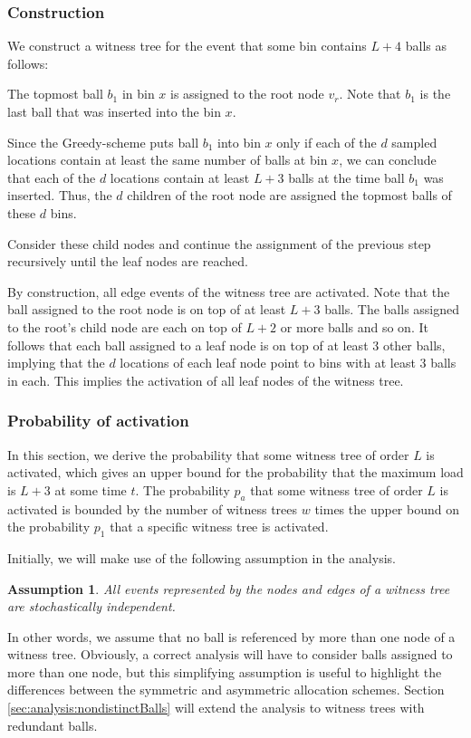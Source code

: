 \documentclass[a4paper,12pt]{article}
\newtheorem{assumption}{Assumption}
\begin{document}
\subsubsection{Construction}
\label{sec:analysis:constructionSymWT}
We construct a witness tree for the event that some bin contains $L+4$ balls as follows:
\begin{compactenum}
\item The topmost ball $b_1$ in bin $x$ is assigned to the root node $v_r$. Note that $b_1$ is the last ball that was inserted into the bin $x$.
\item Since the Greedy-scheme puts ball $b_1$ into bin $x$ only if each of the $d$ sampled locations contain at least the same number of balls at bin $x$, we can conclude that each of the $d$ locations contain at least $L+3$ balls at the time ball $b_1$ was inserted. Thus, the $d$ children of the root node are assigned the topmost balls of these $d$ bins.
\item Consider these child nodes and continue the assignment of the previous step recursively until the leaf nodes are reached.  
\end{compactenum}

By construction, all edge events of the witness tree are activated. Note that the ball assigned to the root node is on top of at least $L+3$ balls. The balls assigned to the root's child node are each on top of $L+2$ or more balls and so on. It follows that each ball assigned to a leaf node is on top of at least 3 other balls, implying that the $d$ locations of each leaf node point to bins with at least 3 balls in each. This implies the activation of all leaf nodes of the witness tree.

\subsubsection{Probability of activation}
\label{sec:analysis:probabilitySymWT}
In this section, we derive the probability that some witness tree of order $L$ is activated, which gives an upper bound for the probability that the maximum load is $L+3$ at some time $t$. The probability $p_a$ that some witness tree of order $L$ is activated is bounded by the number of witness trees $w$ times the upper bound on the probability $p_1$ that a specific witness tree is activated.

Initially, we will make use of the following assumption in the analysis. 
\begin{assumption}
\label{assumption:independence}
All events represented by the nodes and edges of a witness tree are stochastically independent. 
\end{assumption}
In other words, we assume that no ball is referenced by more than one node of a witness tree. Obviously, a correct analysis will have to consider balls assigned to more than one node, but this simplifying assumption is useful to highlight the differences between the symmetric and asymmetric allocation schemes. Section \ref{sec:analysis:nondistinctBalls} will extend the analysis to witness trees with redundant balls.
\end{document}
